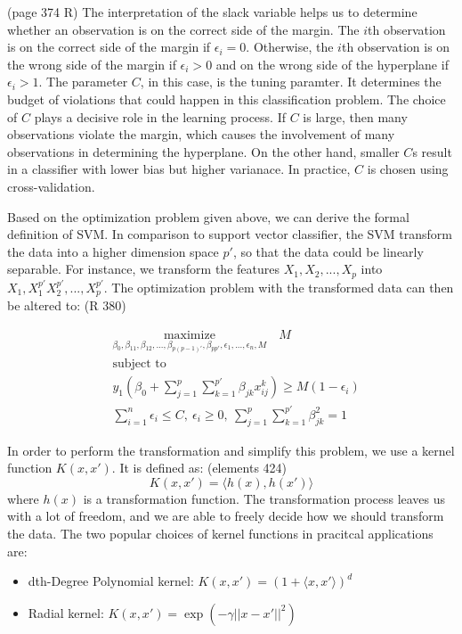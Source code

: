 (page 374 R)
The interpretation of the slack variable helps us to determine whether an observation is on the correct side of the margin.
The $i$th observation is on the correct side of the margin if $\epsilon_i = 0$. Otherwise, 
the $i$th observation is on the wrong side of the margin if $\epsilon_i > 0$ and on the wrong side of the hyperplane
if $\epsilon_i > 1$. The parameter $C$, in this case, is the tuning paramter. It determines the budget of violations
that could happen in this classification problem. The choice of $C$ plays a decisive role in the learning process.
If $C$ is large, then many observations violate the margin, which causes the involvement of many observations in 
determining the hyperplane. On the other hand, smaller $C$s result in a classifier with lower bias but higher varianace.
In practice, $C$ is chosen using cross-validation. 

Based on the optimization problem given above, we can derive the formal definition of SVM. In comparison to 
support vector classifier, the SVM transform the data into a higher dimension space $p'$, so that the data could be
linearly separable. For instance, we transform the features $X_1, X_2, ..., X_p$ into $X_1, X_1^{p'} X_2^{p'}, ..., X_p^{p'}$.
The optimization problem with the transformed data can then be altered to: (R 380)

\begin{equation}
    \begin{aligned}
      & \underset{\textstyle {\beta_0, \beta_{11}, \beta_{12}, ..., \beta_{p(p-1)'}, \beta_{pp'}, \epsilon_1, ..., \epsilon_n, M}}{\text{maximize}} \quad
        M \\
      & \text{subject to} \\
      & y_1(\beta_0 + \sum_{j=1}^p \sum_{k=1}^{p'} \beta_{jk}x_{ij}^k )\geq M (1-\epsilon_i) \\
      & \sum_{i=1}^n\epsilon_i \leq C,\  \epsilon_i \geq 0, \ \sum_{j=1}^p\sum_{k=1}^{p'}\beta_{jk}^2 = 1
    \end{aligned}
\end{equation}

In order to perform the transformation and simplify this problem, we use a kernel function $K(x, x')$. It is defined as: (elements 424)
\begin{equation}
    K(x, x') = \langle h(x), h(x') \rangle
\end{equation}
where $h(x)$ is a transformation function. 
The transformation process leaves us with a lot of freedom, and we are able to freely decide how we should transform the
data. The two popular choices of kernel functions in pracitcal applications are:
\begin{itemize}
    \item dth-Degree Polynomial kernel: $K(x, x') = (1 + \langle x, x' \rangle)^d$
    \item Radial kernel: $K(x, x') = \exp(-\gamma ||x - x'||^2)$
\end{itemize}

